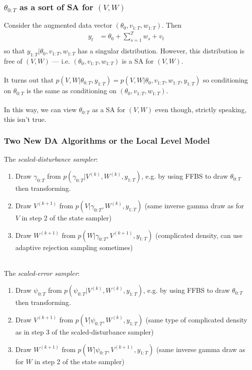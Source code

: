 \documentclass[xcolor=dvipsnames]{beamer}\usepackage{graphicx, color}
\begin{document}
\begin{frame}
  \frametitle{$\theta_{0:T}$ as a sort of SA for $(V,W)$}
  Consider the augmented data vector $(\theta_0, v_{1:T}, w_{1:T})$. Then
  \begin{align*}
    y_t & = \theta_0 + \textstyle\sum_{s=1}^Tw_s + v_t\\
  \end{align*}
  so that $y_{1:T}|\theta_0, v_{1:T}, w_{1:T}$ has a singular distribution. However, this distribution is free of $(V,W)$ --- i.e. $(\theta_0, v_{1:T}, w_{1:T})$ is a SA for $(V,W)$.\\~\\
  
  \pause
It turns out that $p(V,W|\theta_{0:T}, y_{1:T})=p(V,W|\theta_0, v_{1:T}, w_{1:T}, y_{1:T})$ so conditioning on $\theta_{0:T}$ is the same as conditioning on $(\theta_0, v_{1:T}, w_{1:T})$.\\~\\

In this way, we can view $\theta_{0:T}$ as a SA for $(V,W)$ even though, strictly speaking, this isn't true.
\end{frame}

\begin{frame}
  \frametitle{Two New DA Algorithms or the Local Level Model}
The {\it \color{red} scaled-disturbance sampler}:
\begin{enumerate}
\item Draw $\gamma_{0:T}$ from $p(\gamma_{0:T}|V^{(k)}, W^{(k)}, y_{1:T})$, e.g. by using FFBS to draw $\theta_{0:T}$ then transforming.
\item Draw $V^{(k+1)}$ from $p(V|\gamma_{0:T},W^{(k)}, y_{1:T})$ (same inverse gamma draw as for $V$ in step 2 of the state sampler)
\item Draw $W^{(k+1)}$ from $p(W|\gamma_{0:T}, V^{(k+1)}, y_{1:T})$ (complicated density, can use adaptive rejection sampling sometimes)\\~\\
\end{enumerate}
\pause
The {\it \color{red} scaled-error sampler}:
\begin{enumerate}
\item Draw $\psi_{0:T}$ from $p(\psi_{0:T}|V^{(k)}, W^{(k)}, y_{1:T})$, e.g. by using FFBS to draw $\theta_{0:T}$ then transforming.
\item Draw $V^{(k+1)}$ from $p(V|\psi_{0:T}, W^{(k)}, y_{1:T})$ (same type of complicated density as in step 3 of the scaled-disturbance sampler)
\item Draw $W^{(k+1)}$ from $p(W|\psi_{0:T},V^{(k+1)}, y_{1:T})$ (same inverse gamma draw as for $W$ in step 2 of the state sampler)
\end{enumerate}
\end{frame}
\end{document}

